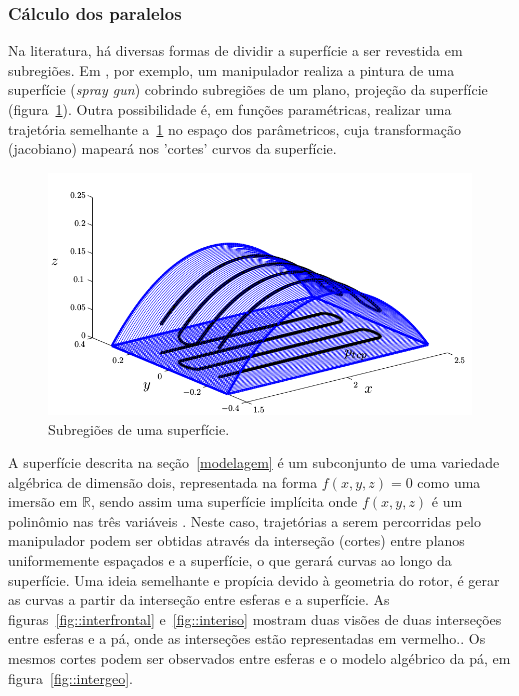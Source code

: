 \subsubsection{Cálculo dos paralelos}
Na literatura, há diversas formas de dividir a superfície a ser revestida em
subregiões. Em \cite{from2010off}, por exemplo, um manipulador realiza a pintura
de uma superfície (\textit{spray gun}) cobrindo subregiões de um plano, projeção
da superfície (figura~\ref{fig::pal}). Outra possibilidade é, em funções
paramétricas, realizar uma trajetória semelhante a~\ref{fig::pal} no espaço dos
parâmetricos, cuja transformação (jacobiano) mapeará nos 'cortes' curvos da
superfície.

\begin{figure}[!ht]
	\centering	
	\includegraphics[width=\columnwidth]{figs/planejamento/pal.png}
	\caption{Subregiões de uma superfície.}
	\label{fig::pal}
\end{figure}


A superfície descrita na seção~\ref{modelagem} é um subconjunto de uma
variedade algébrica de dimensão dois, representada na forma $f(x,y,z)=0$ como
uma imersão em $\mathbb{R}$, sendo assim uma superfície implícita onde
$f(x,y,z)$ é um polinômio nas três variáveis .
Neste caso, trajetórias a serem percorridas pelo manipulador podem ser obtidas através da interseção (cortes)
entre planos uniformemente espaçados e a superfície, o que gerará curvas ao
longo da superfície. Uma ideia semelhante e propícia devido à geometria do
rotor, é gerar as curvas a partir da interseção entre esferas e a superfície. As
figuras~\ref{fig::interfrontal} e~\ref{fig::interiso} mostram duas visões de
duas interseções entre esferas e a pá, onde as interseções estão representadas
em vermelho.. Os mesmos cortes podem ser observados entre esferas e o modelo
algébrico da pá, em figura~\ref{fig::intergeo}.


